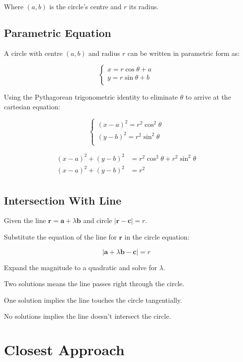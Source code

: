 \documentclass[a4paper,11pt]{article}
\newcommand{\bb}{\boldsymbol}
\begin{document}
Where $(a, b)$ is the circle's centre and $r$ its radius.


\subsection{Parametric Equation}

A circle with centre $(a, b)$ and radius $r$ can be written in parametric form
as:

$$
\begin{cases}
	x = r \cos{\theta} + a \\
	y = r \sin{\theta} + b \\
\end{cases}
$$

Using the Pythagorean trigonometric identity to eliminate $\theta$ to arrive at
the cartesian equation:

$$
\begin{cases}
	(x - a)^2 = r^2 \cos^2{\theta} \\
	(y - b)^2 = r^2 \sin^2{\theta} \\
\end{cases}
$$

$$
\begin{aligned}
	(x - a)^2 + (y - b)^2 & = r^2 \cos^2{\theta} + r^2 \sin^2{\theta} \\
	(x - a)^2 + (y - b)^2 & = r^2 \\
\end{aligned}
$$


\subsection{Intersection With Line}

Given the line $\bb{r} = \bb{a} + \lambda \bb{b}$ and circle
$\lvert \bb{r} - \bb{c} \rvert = r$.

Substitute the equation of the line for $\bb{r}$ in the circle equation:

$$
\lvert \bb{a} + \lambda \bb{b} - \bb{c} \rvert = r
$$

Expand the magnitude to a quadratic and solve for $\lambda$.

Two solutions means the line passes right through the circle.

One solution implies the line touches the circle tangentially.

No solutions implies the line doesn't intersect the circle.




\section{Closest Approach}
\end{document}
